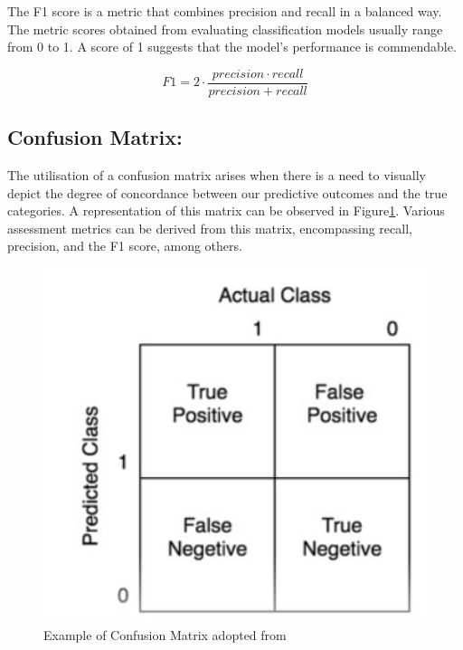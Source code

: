 The F1 score is a metric that combines precision and recall in a balanced way. The metric scores obtained from evaluating classification models usually range from 0 to 1. A score of 1 suggests that the model's performance is commendable.

 $$ F1 = 2 \cdot \frac{precision \cdot recall}{precision + recall} $$

 \subsection{Confusion Matrix:}
 

The utilisation of a confusion matrix arises when there is a need to visually depict the degree of concordance between our predictive outcomes and the true categories. A representation of this matrix can be observed in Figure\ref{example CM }\cite{ARAVINDA20221}. Various assessment metrics can be derived from this matrix, encompassing recall, precision, and the F1 score, among others.

\begin{figure}[h]
\centering
\centerline{\includegraphics[width=1\textwidth]{confusionexample.png}}
\caption{Example of Confusion Matrix adopted from \cite{ARAVINDA20221}}
\label{example CM }
\end{figure}







